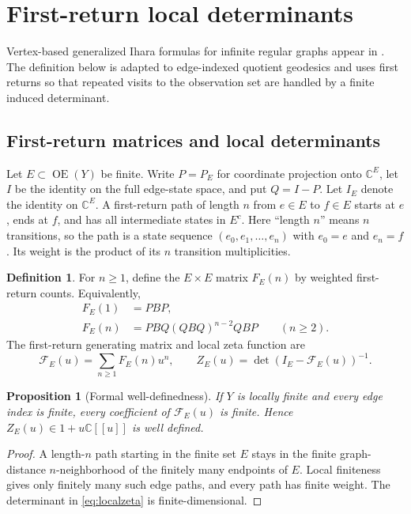 \documentclass[11pt,reqno]{amsart}
\numberwithin{equation}{section}
\newtheorem{proposition}[theorem]{Proposition}
\theoremstyle{definition}
\newtheorem{definition}[theorem]{Definition}
\theoremstyle{remark}
\newcommand{\OrE}{\operatorname{OE}}
\newcommand{\cF}{\mathcal F}
\begin{document}
\section{First-return local determinants}
\label{sec:local}

Vertex-based generalized Ihara formulas for infinite regular graphs appear in
\cite{ChintaJorgensonKarlsson2015}.  The definition below is adapted to
edge-indexed quotient geodesics and uses first returns so that repeated visits
to the observation set are handled by a finite induced determinant.

\subsection{First-return matrices and local determinants}

Let $E\subset\OrE(Y)$ be finite.  Write $P=P_E$ for coordinate projection onto
$\mathbb C^E$, let $I$ be the identity on the full edge-state space, and put
$Q=I-P$.  Let $I_E$ denote the identity on $\mathbb C^E$.  A first-return path
of length $n$ from $e\in E$ to
$f\in E$ starts at $e$, ends at $f$, and has all intermediate states in
$E^c$.  Here ``length $n$'' means $n$ transitions, so the path is a state
sequence $(e_0,e_1,\ldots,e_n)$ with $e_0=e$ and $e_n=f$.  Its weight is the
product of its $n$ transition multiplicities.

\begin{definition}\label{def:firstreturn}
For $n\ge1$, define the $E\times E$ matrix $F_E(n)$ by weighted first-return
counts.  Equivalently,
\begin{align}
 F_E(1)&=PBP,\label{eq:F1}\\
 F_E(n)&=PBQ(QBQ)^{n-2}QBP\qquad(n\ge2).\label{eq:Fn}
\end{align}
The first-return generating matrix and local zeta function are
\begin{equation}\label{eq:localzeta}
 \cF_E(u)=\sum_{n\ge1}F_E(n)u^n,
 \qquad
 Z_E(u)=\det(I_E-\cF_E(u))^{-1}.
\end{equation}
\end{definition}

\begin{proposition}[Formal well-definedness]\label{prop:formalfinite}
If $Y$ is locally finite and every edge index is finite, every coefficient of
$\cF_E(u)$ is finite.  Hence $Z_E(u)\in1+u\mathbb C[[u]]$ is well defined.
\end{proposition}

\begin{proof}
A length-$n$ path starting in the finite set $E$ stays in the finite
graph-distance $n$-neighborhood of the finitely many endpoints of $E$.
Local finiteness gives only finitely many such edge paths, and every path has
finite weight.
The determinant in \eqref{eq:localzeta} is finite-dimensional.
\end{proof}
\end{document}
